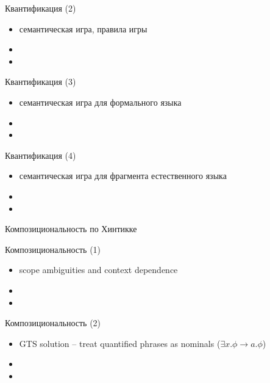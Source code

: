 \documentclass{beamer}
\begin{document}
\begin{frame}{Квантификация (2)}
\begin{itemize}
	\item семантическая игра, правила игры
	\item 
	\item 
\end{itemize}
\end{frame}

\begin{frame}{Квантификация (3)}
\begin{itemize}
	\item семантическая игра для формального языка
	\item 
	\item 
\end{itemize}
\end{frame}

\begin{frame}{Квантификация (4)}
\begin{itemize}
	\item семантическая игра для фрагмента естественного языка
	\item 
	\item 
\end{itemize}
\end{frame}




\begin{frame}{}
\begin{center}
Композициональность по Хинтикке
\end{center}
\end{frame}

\begin{frame}{Композициональность (1)}
\begin{itemize}
	\item scope ambiguities and context dependence
	\item 
	\item 
\end{itemize}
\end{frame}

\begin{frame}{Композициональность (2)}
\begin{itemize}
	\item GTS solution -- treat quantified phrases as nominals ($\exists x . \phi \to a . \phi$)
	\item 
	\item 
\end{itemize}
\end{frame}
\end{document}
